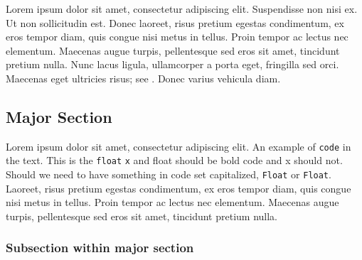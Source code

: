 

\setcounter{table}{0}
\setcounter{footnote}{0}
\setcounter{lstlisting}{0}



Lorem ipsum dolor sit amet, consectetur
adipiscing elit. Suspendisse non nisi ex. Ut non sollicitudin est. Donec
laoreet, risus pretium egestas condimentum, ex eros tempor diam, quis
congue nisi metus in tellus. Proin tempor ac lectus nec elementum.
Maecenas augue turpis, pellentesque sed eros sit amet, tincidunt pretium
nulla. Nunc lacus ligula, ullamcorper a porta eget, fringilla sed orci.
Maecenas eget ultricies risus; see . Donec varius vehicula diam.

\subsection[Major Section]{Major Section}\label{description}

Lorem ipsum dolor sit amet, consectetur
adipiscing elit. An example of \lstinline!code! in the text. This is the \lstinline!float! \lstinline!x! and float should be bold code and x should not. Should we need to have something in code set capitalized, \lstinline!Float! or \lstinline!Float!. Laoreet, risus pretium egestas condimentum, ex eros tempor diam, quis
congue nisi metus in tellus. Proin tempor ac lectus nec elementum.
Maecenas augue turpis, pellentesque sed eros sit amet, tincidunt pretium
nulla. 

\subsubsection[Subsection within major section]{Subsection within major section}\label{c++-attribute-syntax}

